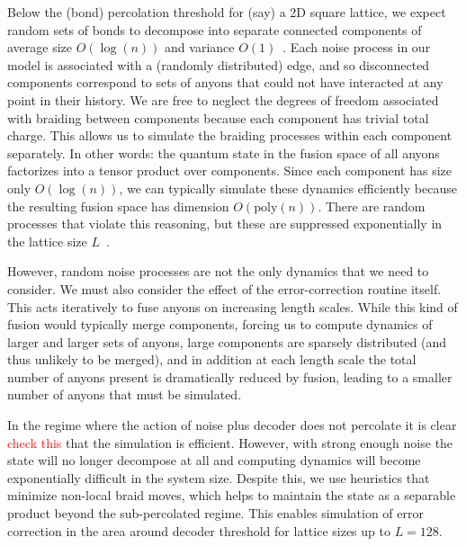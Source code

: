 \documentclass[aps, prl, letterpaper, twocolumn, superscriptaddress, notitlepage, 10pt]{revtex4}
\newcommand{\dude}[1]{\textcolor{red}{#1}}
\begin{document}
Below the (bond) percolation threshold for (say) a 2D square lattice, we expect random sets of 
bonds to decompose into separate connected components 
of average size $O(\log(n))$ and variance $O(1)$~\cite{Bazant2000}.
Each noise process in our model is associated with a (randomly distributed) edge, and so 
disconnected components correspond to sets of anyons that could not have interacted at any 
point in their history. 
We are free to neglect the degrees of freedom associated with braiding between components 
because each component has trivial total charge.
This allows us to simulate the braiding processes within each component separately. 
In other words: the quantum state in the fusion space of all anyons factorizes into 
a tensor product over components. 
Since each 
component has size only $O(\log(n))$, we can typically simulate these dynamics efficiently 
because the resulting fusion space has dimension $O(\mathrm{poly}(n))$. 
There are 
random processes that violate this reasoning, but these are suppressed 
exponentially in the lattice size $L$~\cite{Grimmett1989}. 

However, random noise processes are not the only dynamics that we need to consider. We 
must also consider the effect of the error-correction routine itself. This acts iteratively to fuse 
anyons on increasing length scales. While this kind of fusion would typically merge components, 
forcing us to compute dynamics of larger and larger sets of anyons,
large components are sparsely distributed
(and thus unlikely to be merged), and in addition at each length scale the total number of 
anyons present is dramatically reduced by fusion, leading to a smaller number of anyons that 
must be simulated.

In the regime where the action of noise plus decoder does not percolate
it is clear \dude{check this} that the simulation is efficient.
However, with strong enough noise the state will
no longer decompose at all and computing dynamics will
become exponentially difficult in the system size.
Despite this, we use heuristics %
that minimize non-local braid moves, which helps to
maintain the state as a separable product beyond the
sub-percolated regime.
This enables simulation of error correction in
the area around decoder threshold for lattice sizes up to $L=128.$

\end{document}
